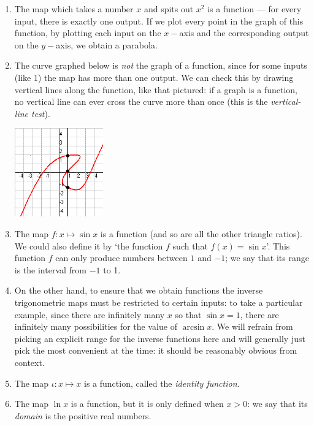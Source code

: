 \begin{exs}\leavevmode
  \begin{enumerate}
    \item The map which takes a number $ x $ and spits out $ x^2 $ is a function --- for every input, there is exactly one output. If
          we plot every point in the graph of this function, by plotting each input on the $ x-$axis and the corresponding output on
          the $ y-$axis, we obtain a parabola.
    \item The curve graphed below is \textit{not} the graph of a function, since for some inputs (like 1) the map has more than one output. We can check this
          by drawing vertical lines along the function, like that pictured: if a graph is a function, no vertical line can ever cross the curve
          more than once (this is the \textit{vertical-line test}).
          \begin{center}
            \includegraphics[width=0.3\textwidth]{linetest}
          \end{center}
    \item The map $ f : x \mapsto \sin x $ is a function (and so are all the other triangle ratios). We could also define it by `the
          function $ f $ such that $ f(x) = \sin x $'. This function $ f $ can only produce numbers between $1$ and $-1$; we say that
          its range is the interval from $ -1 $ to 1.
    \item On the other hand, to ensure that we obtain functions the inverse trigonometric maps must be restricted to certain inputs: to
          take a particular example, since there are infinitely many $ x $ so that $ \sin x = 1 $, there are infinitely many possibilities
          for the value of $ \arcsin x $. We will refrain from picking an explicit range for the inverse functions here and will generally
          just pick the most convenient at the time: it should be reasonably obvious from context.
    \item The map $ \iota : x \mapsto x $ is a function, called the \textit{identity function}.
    \item The map $ \ln x $ is a function, but it is only defined when $ x > 0 $: we say that its \textit{domain} is the positive real numbers.

\end{enumerate}
\end{exs}
